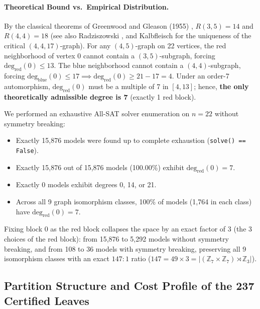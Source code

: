 \documentclass[11pt,a4paper]{article}
\theoremstyle{definition}
\begin{document}
\paragraph{Theoretical Bound vs.\ Empirical Distribution.} By the classical theorems of Greenwood and Gleason (1955) \cite{greenwood1955}, $R(3,5) = 14$ and $R(4,4) = 18$ (see also Radziszowski \cite{radziszowski2021}, and Kalbfleisch \cite{kalbfleisch1966} for the uniqueness of the critical $(4,4,17)$-graph). For any $(4,5)$-graph on 22 vertices, the red neighborhood of vertex 0 cannot contain a $(3,5)$-subgraph, forcing $\text{deg}_{\text{red}}(0) \le 13$. The blue neighborhood cannot contain a $(4,4)$-subgraph, forcing $\text{deg}_{\text{blue}}(0) \le 17 \implies \text{deg}_{\text{red}}(0) \ge 21 - 17 = 4$. Under an order-7 automorphism, $\text{deg}_{\text{red}}(0)$ must be a multiple of 7 in $[4, 13]$; hence, \textbf{the only theoretically admissible degree is 7} (exactly 1 red block).

We performed an exhaustive All-SAT solver enumeration on $n=22$ without symmetry breaking:
\begin{itemize}
    \item Exactly 15,876 models were found up to complete exhaustion (\texttt{solve() == False}).
    \item Exactly 15,876 out of 15,876 models (100.00\%) exhibit $\text{deg}_{\text{red}}(0) = 7$.
    \item Exactly 0 models exhibit degrees 0, 14, or 21.
    \item Across all 9 graph isomorphism classes, 100\% of models (1,764 in each class) have $\text{deg}_{\text{red}}(0) = 7$.
\end{itemize}
Fixing block 0 as the red block collapses the space by an exact factor of 3 (the 3 choices of the red block): from 15,876 to 5,292 models without symmetry breaking, and from 108 to 36 models with symmetry breaking, preserving all 9 isomorphism classes with an exact $147:1$ ratio ($147 = 49 \times 3 = |(\mathbb{Z}_7 \times \mathbb{Z}_7) \rtimes \mathbb{Z}_3|$).

\subsection{Partition Structure and Cost Profile of the 237 Certified Leaves}
\end{document}
